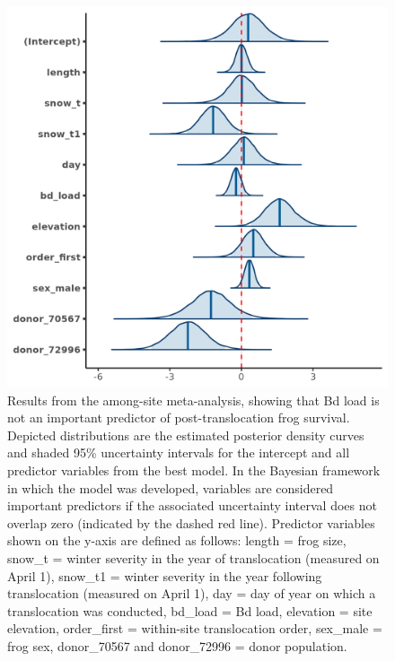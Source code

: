 \documentclass[
  letterpaper,
  DIV=11,
  numbers=noendperiod]{scrartcl}
\begin{document}
\begin{figure}

{\centering \includegraphics[width=5.20833in,height=\textheight]{figures/mcmc_areas_m1d.png}

}

\caption{\label{fig-survival-postdens}Results from the among-site
meta-analysis, showing that Bd load is not an important predictor of
post-translocation frog survival. Depicted distributions are the
estimated posterior density curves and shaded 95\% uncertainty intervals
for the intercept and all predictor variables from the best model. In
the Bayesian framework in which the model was developed, variables are
considered important predictors if the associated uncertainty interval
does not overlap zero (indicated by the dashed red line). Predictor
variables shown on the y-axis are defined as follows: length = frog
size, snow\_t = winter severity in the year of translocation (measured
on April 1), snow\_t1 = winter severity in the year following
translocation (measured on April 1), day = day of year on which a
translocation was conducted, bd\_load = Bd load, elevation = site
elevation, order\_first = within-site translocation order, sex\_male =
frog sex, donor\_70567 and donor\_72996 = donor population.}

\end{figure}
\end{document}
